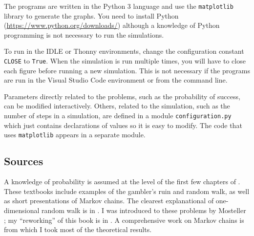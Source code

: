 The programs are written in the Python 3 language and use the \verb+matplotlib+ library to generate the graphs. You need to install Python (\url{https://www.python.org/downloads/}) although a knowledge of Python programming is not necessary to run the simulations.

To run in the IDLE or Thonny environments, change the configuration constant \verb+CLOSE+ to \verb+True+. When the simulation is run multiple times, you will have to close each figure before running a new simulation. This is not necessary if the programs are run in the Visual Studio Code environment or from the command line.

Parameters directly related to the problems, such as the probability of success, can be modified interactively. Others, related to the simulation, such as the number of steps in a simulation, are defined in a module \verb+configuration.py+ which just contains declarations of values so it is easy to modify. The code that uses \verb+matplotlib+ appears in a separate module.

\subsection*{Sources}

A knowledge of probability is assumed at the level of the first few chapters of \cite{BW,ross}. These textbooks include examples of the gambler's ruin and random walk, as well as short presentations of Markov chains. The clearest explanational of one-dimensional random walk is in \cite{border}. I was introduced to these problems by Mosteller \cite{mosteller}; my ``reworking'' of this book is in \cite{mos}. A comprehensive work on Markov chains is \cite{privault} from which I took most of the theoretical results.
